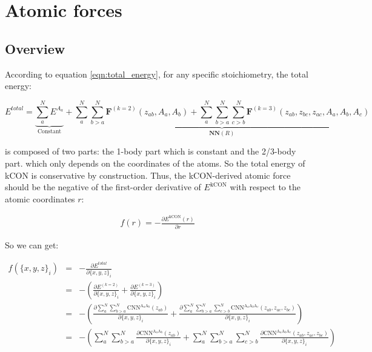
\section{Atomic forces}

\subsection{Overview}

According to equation \ref{eqn:total_energy}, for any specific stoichiometry, the total 
energy: 

\begin{equation}
E^{total} =
\underbrace{\sum_{a}^{N}{E^{A_a}}}_{\text{Constant}} + 
\underbrace{\sum_{a}^{N}{\sum_{b>a}^{N}{\mathbf{F}^{(k=2)}(z_{ab}, A_a, A_b)}} + 
\sum_{a}^{N}{\sum_{b>a}^{N}{\sum_{c>b}^{N}{
	\mathbf{F}^{(k=3)}(z_{ab}, z_{bc}, z_{ac}, A_a, A_b, A_c)}}
}}_{\mathbf{NN}(R)}
\end{equation}

\noindent is composed of two parts: the 1-body part which is constant and the 2/3-body part. 
which only depends on the coordinates of the atoms. So the total energy of kCON is 
conservative by construction. Thus, the kCON-derived atomic force should be the negative of 
the first-order derivative of $E^{\mathrm{kCON}}$ with respect to the atomic coordinates $r$:

\begin{eqnarray}
f(r) = -\frac{\partial E^{\mathrm{kCON}}(r)}{\partial r}
\end{eqnarray}

\noindent So we can get:

\begin{eqnarray}
f(\{x, y, z\}_{i})
& = & 
-\frac{\partial{E^{total}}}{\partial{\{x, y, z\}_{i}}} \nonumber \\
& = & 
-\left(
	\frac{\partial{E^{(k=2)}}}{\partial{\{x, y, z\}_i}} + 
	\frac{\partial{E^{(k=3)}}}{\partial{\{x, y, z\}_i}} 
\right) \nonumber \\
& = & 
-\left(
\frac{
	\partial{\sum_{a}^{N}{\sum_{b>a}^{N}{
		\mathrm{CNN}^{\mathrm{A}_{a}\mathrm{A}_{b}}}(z_{ab})}}
	}
	{\partial{\{x, y, z\}_i}
} + 
\frac{
	\partial{\sum_{a}^{N}{\sum_{b>a}^{N}{\sum_{c>b}^{N}{
		\mathrm{CNN}^{\mathrm{A}_{a}\mathrm{A}_{b}\mathrm{A}_{c}}}
		(z_{ab}, z_{ac}, z_{bc})}}}
	}
	{\partial{\{x, y, z\}_i}} 
\right) \nonumber \\
& = & 
-\left(
\sum_{a}^{N}{\sum_{b>a}^{N}{
\frac{
	\partial{\mathrm{CNN}^{\mathrm{A}_{a}\mathrm{A}_{b}}}(z_{ab})}{
	\partial{\{x, y, z\}_i}
}}} + 
\sum_{a}^{N}{\sum_{b>a}^{N}{\sum_{c>b}^{N}{
\frac{
	\partial{\mathrm{CNN}^{\mathrm{A}_{a}\mathrm{A}_{b}\mathrm{A}_{c}}}
		(z_{ab}, z_{ac}, z_{bc})}{
	\partial{\{x, y, z\}_i}
}}}}
\right)
\end{eqnarray}

